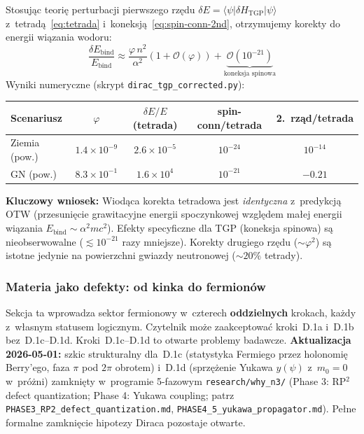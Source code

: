 \begin{proposition}%
\label{prop:dirac-perturbative}
Stosuj\k{a}c teori\k{e} perturbacji pierwszego rz\k{e}du
$\delta E = \langle\psi|\delta H_{\mathrm{TGP}}|\psi\rangle$
z~tetrad\k{a}~\eqref{eq:tetrada} i~koneksj\k{a}~\eqref{eq:spin-conn-2nd},
otrzymujemy korekty do energii wi\k{a}zania wodoru:
\begin{equation}\label{eq:dirac-perturbative-result}
  \boxed{
    \frac{\delta E_{\mathrm{bind}}}{E_{\mathrm{bind}}}
    \approx \frac{\varphi \, n^2}{\alpha^2}
    \left(1 + \mathcal{O}(\varphi)\right)
    + \underbrace{\mathcal{O}(10^{-21})}_{\text{koneksja spinowa}}
  }
\end{equation}
Wyniki numeryczne (skrypt \texttt{dirac\_tgp\_corrected.py}):
\begin{center}
\begin{tabular}{lcccc}
\toprule
  Scenariusz & $\varphi$ & $\delta E/E$ (tetrada) &
  spin-conn/tetrada & 2.~rz\k{a}d/tetrada \\
\midrule
  Ziemia (pow.) & $1.4\times 10^{-9}$
    & $2.6\times 10^{-5}$ & $10^{-24}$ & $10^{-14}$ \\
  GN (pow.) & $8.3\times 10^{-1}$
    & $1.6\times 10^{4}$ & $10^{-21}$ & $-0.21$ \\
\bottomrule
\end{tabular}
\end{center}
\textbf{Kluczowy wniosek:}
Wiod\k{a}ca korekta tetradowa jest \emph{identyczna} z~predykcj\k{a}
OTW (przesuni\k{e}cie grawitacyjne energii spoczynkowej wzgl\k{e}dem
ma\l{}ej energii wi\k{a}zania $E_{\mathrm{bind}} \sim \alpha^2 mc^2$).
Efekty specyficzne dla TGP (koneksja spinowa) s\k{a} nieobserwowalne
($\lesssim 10^{-21}$ razy mniejsze).
Korekty drugiego rz\k{e}du ($\sim\varphi^2$) s\k{a} istotne
jedynie na powierzchni gwiazdy neutronowej ($\sim 20\%$ tetrady).
\end{proposition}

\subsubsection{Materia jako defekty: od kinka do fermion\'ow}

\begin{remark}\label{rem:fermion-4-steps}
Sekcja ta wprowadza sektor fermionowy w~czterech \textbf{oddzielnych} krokach,
ka\.zdy z~w\l{}asnym statusem logicznym. Czytelnik mo\.ze zaakceptowa\'c
kroki~D.1a i~D.1b bez~D.1c--D.1d. Kroki~D.1c--D.1d to otwarte problemy badawcze.
\textbf{Aktualizacja 2026-05-01:} szkic strukturalny dla~D.1c (statystyka
Fermiego przez holonomi\k{e} Berry'ego, faza $\pi$ pod $2\pi$ obrotem)
i~D.1d (sprz\k{e}\.zenie Yukawa $y(\psi)$ z~$m_0=0$ w~pr\'o\.zni)
zamkni\k{e}ty w~programie 5-fazowym \texttt{research/why\_n3/}
(Phase 3: RP$^2$ defect quantization; Phase 4: Yukawa coupling;
patrz \texttt{PHASE3\_RP2\_defect\_quantization.md},
\texttt{PHASE4\_5\_yukawa\_propagator.md}). Pe\l{}ne formalne
zamkni\k{e}cie hipotezy Diraca pozostaje otwarte.
\end{remark}

